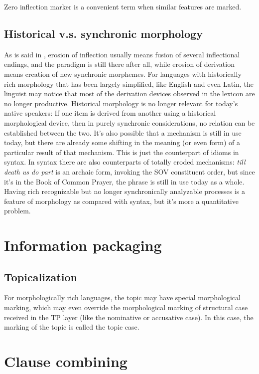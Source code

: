 \documentclass[UTF8, a4paper, oneside, scheme=plain]{ctexart}
\newcommand*{\corpus}[1]{\emph{#1}}
\begin{document}
Zero inflection marker is a convenient term when similar features are marked.

\subsection{Historical v.s. synchronic morphology}\label{sec:history-or-current-morphology}

As is said in ,
erosion of inflection usually means fusion of several inflectional endings,
and the paradigm is still there after all,
while erosion of derivation means creation of new synchronic morphemes.
For languages with historically rich morphology
that has been largely simplified, 
like English and even Latin, 
the linguist may notice that most of the derivation devices observed in the lexicon 
are no longer productive.
Historical morphology is no longer relevant for today's native speakers:
If one item is derived from another using a historical morphological device,
then in purely synchronic considerations,
no relation can be established between the two.
It's also possible that a mechanism is still in use today,
but there are already some shifting in the meaning (or even form) 
of a particular result of that mechanism.
This is just the counterpart of idioms in syntax.
In syntax there are also counterparts of totally eroded mechanisms:
\corpus{till death us do part} is an archaic form,
invoking the SOV constituent order,
but since it's in the Book of Common Prayer,
the phrase is still in use today as a whole.
Having rich recognizable but no longer synchronically analyzable processes 
is a feature of morphology as compared with syntax,
but it's more a quantitative problem.

\section{Information packaging}

\subsection{Topicalization}

For morphologically rich languages,
the topic may have special morphological marking,
which may even override the morphological marking of structural case received in the TP layer 
(like the nominative or accusative case).
In this case,
the marking of the topic is called the topic case.

\section{Clause combining}
\end{document}
